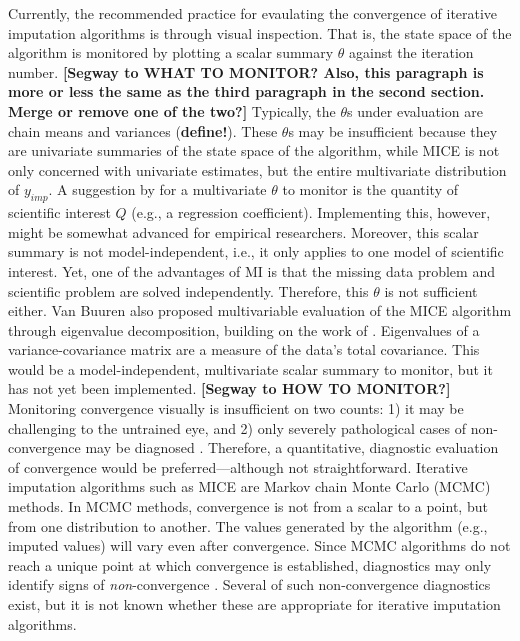 \documentclass[Royal,times,sageh]{sagej}
\begin{document}
Currently, the recommended practice for evaulating the convergence of
iterative imputation algorithms is through visual inspection. That is,
the state space of the algorithm is monitored by plotting a scalar
summary \(\theta\) against the iteration number. \textbf{{[}Segway to
WHAT TO MONITOR? Also, this paragraph is more or less the same as the
third paragraph in the second section. Merge or remove one of the
two?{]}} Typically, the \(\theta\)s under evaluation are chain means and
variances (\textbf{define!}). These \(\theta\)s may be insufficient
because they are univariate summaries of the state space of the
algorithm, while MICE is not only concerned with univariate estimates,
but the entire multivariate distribution of \(y_{imp}\). A suggestion by
\citet{buur18} for a multivariate \(\theta\) to monitor is the quantity
of scientific interest \(Q\) (e.g., a regression coefficient).
Implementing this, however, might be somewhat advanced for empirical
researchers. Moreover, this scalar summary is not model-independent,
i.e., it only applies to one model of scientific interest. Yet, one of
the advantages of MI is that the missing data problem and scientific
problem are solved independently. Therefore, this \(\theta\) is not
sufficient either. Van Buuren \citeyearpar[\(\S\) 4.5.2]{buur18} also
proposed multivariable evaluation of the MICE algorithm through
eigenvalue decomposition, building on the work of \citet{mack03}.
Eigenvalues of a variance-covariance matrix are a measure of the data's
total covariance. This would be a model-independent, multivariate scalar
summary to monitor, but it has not yet been implemented.
\textbf{{[}Segway to HOW TO MONITOR?{]}} Monitoring convergence visually
is insufficient on two counts: 1) it may be challenging to the untrained
eye, and 2) only severely pathological cases of non-convergence may be
diagnosed \citep[\(\S\) 6.5.2]{buur18}. Therefore, a quantitative,
diagnostic evaluation of convergence would be preferred---although not
straightforward. Iterative imputation algorithms such as MICE are Markov
chain Monte Carlo (MCMC) methods. In MCMC methods, convergence is not
from a scalar to a point, but from one distribution to another. The
values generated by the algorithm (e.g., imputed values) will vary even
after convergence. Since MCMC algorithms do not reach a unique point at
which convergence is established, diagnostics may only identify signs of
\emph{non}-convergence \citep{hoff09}. Several of such non-convergence
diagnostics exist, but it is not known whether these are appropriate for
iterative imputation algorithms.
\end{document}
